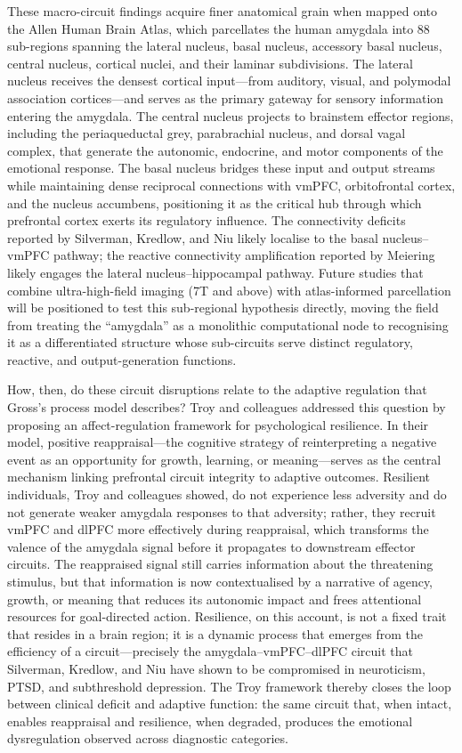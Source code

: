 These macro-circuit findings acquire finer anatomical grain when mapped
onto the Allen Human Brain Atlas, which parcellates the human amygdala into
88 sub-regions spanning the lateral nucleus, basal nucleus, accessory basal
nucleus, central nucleus, cortical nuclei, and their laminar
subdivisions.  The lateral nucleus receives the densest cortical
input---from auditory, visual, and polymodal association cortices---and
serves as the primary gateway for sensory information entering the
amygdala.  The central nucleus projects to brainstem effector regions,
including the periaqueductal grey, parabrachial nucleus, and dorsal vagal
complex, that generate the autonomic, endocrine, and motor components of
the emotional response.  The basal nucleus bridges these input and output
streams while maintaining dense reciprocal connections with vmPFC,
orbitofrontal cortex, and the nucleus accumbens, positioning it as the
critical hub through which prefrontal cortex exerts its regulatory
influence.  The connectivity deficits reported by Silverman, Kredlow, and
Niu likely localise to the basal nucleus--vmPFC pathway; the reactive
connectivity amplification reported by Meiering likely engages the lateral
nucleus--hippocampal pathway.  Future studies that combine ultra-high-field
imaging (7T and above) with atlas-informed parcellation will be positioned
to test this sub-regional hypothesis directly, moving the field from
treating the ``amygdala'' as a monolithic computational node to recognising
it as a differentiated structure whose sub-circuits serve distinct
regulatory, reactive, and output-generation functions.

How, then, do these circuit disruptions relate to the adaptive regulation
that Gross's process model describes?  Troy and colleagues addressed this
question by proposing an affect-regulation framework for psychological
resilience.  In their model, positive reappraisal---the cognitive
strategy of reinterpreting a negative event as an opportunity for growth,
learning, or meaning---serves as the central mechanism linking prefrontal
circuit integrity to adaptive outcomes.  Resilient individuals, Troy and
colleagues showed, do not experience less adversity and do not generate
weaker amygdala responses to that adversity; rather, they recruit vmPFC and
dlPFC more effectively during reappraisal, which transforms the valence of
the amygdala signal before it propagates to downstream effector circuits.
The reappraised signal still carries information about the threatening
stimulus, but that information is now contextualised by a narrative of
agency, growth, or meaning that reduces its autonomic impact and frees
attentional resources for goal-directed action.  Resilience, on this
account, is not a fixed trait that resides in a brain region; it is a
dynamic process that emerges from the efficiency of a circuit---precisely
the amygdala--vmPFC--dlPFC circuit that Silverman, Kredlow, and Niu have
shown to be compromised in neuroticism, PTSD, and subthreshold depression.
The Troy framework thereby closes the loop between clinical deficit and
adaptive function: the same circuit that, when intact, enables reappraisal
and resilience, when degraded, produces the emotional dysregulation observed
across diagnostic categories.

